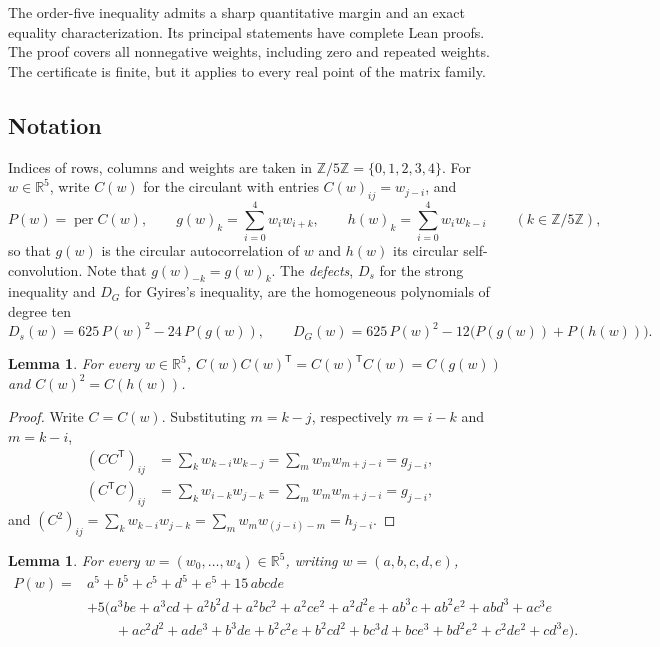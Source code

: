 \documentclass[11pt,a4paper]{article}
\newtheorem{lemma}[theorem]{Lemma}
\theoremstyle{definition}
\theoremstyle{remark}
\newcommand{\R}{\mathbb{R}}
\newcommand{\Z}{\mathbb{Z}}
\newcommand{\per}{\operatorname{per}}
\newcommand{\T}{\mathsf{T}}
\begin{document}
The order-five inequality admits a sharp quantitative margin and an exact equality characterization.
Its principal statements have complete Lean proofs.
The proof covers all nonnegative weights, including zero and repeated weights.
The certificate is finite, but it applies to every real point of the matrix family.

\subsection{Notation}
Indices of rows, columns and weights are taken in $\Z/5\Z=\{0,1,2,3,4\}$. For $w\in\R^5$, write $C(w)$ for the
circulant with entries $C(w)_{ij}=w_{j-i}$, and
\[
P(w)=\per C(w),\qquad g(w)_k=\sum_{i=0}^4w_iw_{i+k},\qquad h(w)_k=\sum_{i=0}^4w_iw_{k-i}\qquad(k\in\Z/5\Z),
\]
so that $g(w)$ is the circular autocorrelation of $w$ and $h(w)$ its circular self-convolution. Note that
$g(w)_{-k}=g(w)_k$. The \emph{defects}, $D_s$ for the strong inequality and $D_G$ for Gyires's inequality, are the
homogeneous polynomials of degree ten
\begin{equation}\label{eq:defects}
D_s(w)=625\,P(w)^2-24\,P(g(w)),\qquad D_G(w)=625\,P(w)^2-12\bigl(P(g(w))+P(h(w))\bigr).
\end{equation}

\begin{lemma}\label{lem:products}
For every $w\in\R^5$, $C(w)C(w)^\T=C(w)^\T C(w)=C(g(w))$ and $C(w)^2=C(h(w))$.
\end{lemma}

\begin{proof}
Write $C=C(w)$. Substituting $m=k-j$, respectively $m=i-k$ and $m=k-i$,
\begin{align*}
(CC^\T)_{ij}&=\sum_kw_{k-i}w_{k-j}=\sum_mw_mw_{m+j-i}=g_{j-i},\\
(C^\T C)_{ij}&=\sum_kw_{i-k}w_{j-k}=\sum_mw_mw_{m+j-i}=g_{j-i},
\end{align*}
and $(C^2)_{ij}=\sum_kw_{k-i}w_{j-k}=\sum_mw_mw_{(j-i)-m}=h_{j-i}$.
\end{proof}

\begin{lemma}\label{lem:P}
For every $w=(w_0,\dots,w_4)\in\R^5$, writing $w=(a,b,c,d,e)$,
\begin{align*}
P(w)={}&a^5+b^5+c^5+d^5+e^5+15\,abcde\\
&+5\bigl(a^3be+a^3cd+a^2b^2d+a^2bc^2+a^2ce^2+a^2d^2e+ab^3c+ab^2e^2+abd^3+ac^3e\\
&\qquad+ac^2d^2+ade^3+b^3de+b^2c^2e+b^2cd^2+bc^3d+bce^3+bd^2e^2+c^2de^2+cd^3e\bigr).
\end{align*}
\end{lemma}
\end{document}
